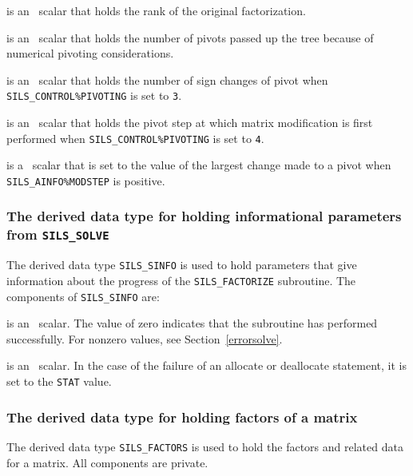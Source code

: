 \documentclass{galahad}
\newcommand{\packagename}{SILS}
\begin{document}
\begin{description}
 is an \integer\ scalar that holds
 the rank of the original factorization.

 is an \integer\ scalar that holds the number of pivots passed
up the tree because of numerical pivoting considerations.

 is an \integer\ scalar that holds the number of sign changes
of pivot when {\tt \packagename\_CONTROL\%PIVOTING} is set to {\tt 3}.

 is an \integer\ scalar that holds the pivot step at which
matrix modification is first performed when
{\tt \packagename\_CO\-NTROL\%PIVOTING} is set to {\tt 4}.

 is a \realdp\ scalar that is set to the value of the largest
change made to a pivot when {\tt \packagename\_AINFO\%MODSTEP} is positive.

\end{description}


\subsubsection{The derived data type for holding informational
 parameters from {\tt \packagename\_SOLVE}}\label{typeinfos}
The derived data type
{\tt \packagename\_SINFO}
is used to hold parameters that give information about the progress of the
{\tt \packagename\_FA\-CTORIZE} subroutine. The components of
{\tt \packagename\_SINFO}
are:

\begin{description}

 is an \integer\ scalar. The value
 of zero indicates that the subroutine has performed
 successfully.  For nonzero values, see Section~\ref{errorsolve}.


 is an \integer\ scalar. In the case of the failure of an
allocate or deallocate statement, it is set to the {\tt STAT} value.

\end{description}


\subsubsection{The derived data type for holding factors of a matrix}
\label{typefactors}
The derived data type
{\tt \packagename\_FACTORS}
is used to hold the factors and related data for a matrix.
All components are private.
\end{document}
